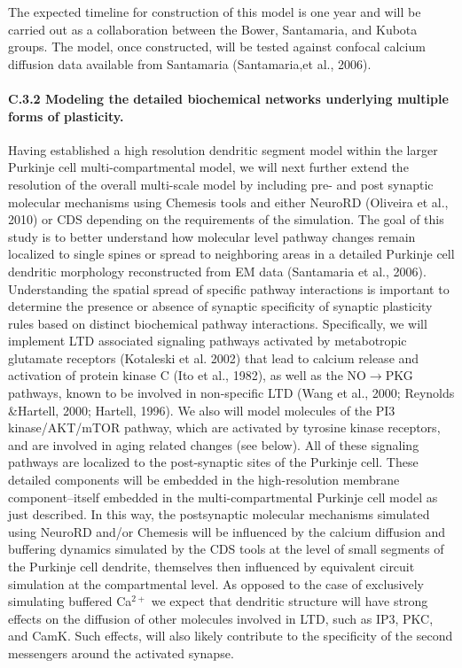 \documentclass[12pt]{article}
\begin{document}
The expected timeline for construction of this model is one year and will be carried out as a collaboration between the Bower, Santamaria, and Kubota groups. The model, once constructed, will be tested against confocal calcium diffusion data available from Santamaria (Santamaria,et al., 2006).

\paragraph{C.3.2 Modeling the detailed biochemical networks underlying multiple forms of plasticity.} Having established a high resolution dendritic segment model within the larger Purkinje cell multi-compartmental model, we will next further extend the resolution of the overall multi-scale model by including pre- and post synaptic molecular mechanisms using Chemesis tools and either NeuroRD (Oliveira et al., 2010) or CDS depending on the requirements of the simulation. The goal of this study is to better understand how molecular level pathway changes remain localized to single spines or spread to neighboring areas in a detailed Purkinje cell dendritic morphology reconstructed from EM data (Santamaria et al., 2006). Understanding the spatial spread of specific pathway interactions is important to determine the presence or absence of synaptic specificity of synaptic plasticity rules based on distinct biochemical pathway interactions. Specifically, we will implement LTD associated signaling pathways activated by metabotropic glutamate receptors (Kotaleski et al. 2002) that lead to calcium release and activation of protein kinase C (Ito et al., 1982), as well as the NO$\rightarrow$PKG pathways, known to be involved in non-specific LTD (Wang et al., 2000; Reynolds \&Hartell, 2000; Hartell, 1996). We also will model molecules of the PI3 kinase/AKT/mTOR pathway, which are activated by tyrosine kinase receptors, and are involved in aging related changes (see below). All of these signaling pathways are localized to the post-synaptic sites of the Purkinje cell. These detailed components will be embedded in the high-resolution membrane component--itself embedded in the multi-compartmental Purkinje cell model as just described. In this way, the postsynaptic molecular mechanisms simulated using NeuroRD and/or Chemesis will be influenced by the calcium diffusion and buffering dynamics simulated by the CDS tools at the level of small segments of the Purkinje cell dendrite, themselves then influenced by equivalent circuit simulation at the compartmental level. As opposed to the case of exclusively simulating buffered Ca$^{2+}$ we expect that dendritic structure will have strong effects on the diffusion of other molecules involved in LTD, such as IP3, PKC, and CamK. Such effects, will also likely contribute to the specificity of the second messengers around the activated synapse.
\end{document}
